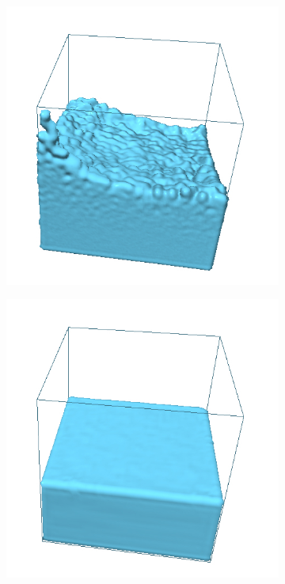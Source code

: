 \begin{figure}[h!]
\begin{subfigure}[t]{.3\textwidth}
		\label{fig:GaussSeidlRB}
	\end{subfigure}
		\begin{subfigure}[t]{.3\textwidth}
			\centering
        	\includegraphics[scale=0.8]{obrazky-figures/app/Simple03.jpg}
        	\label{fig:GaussSeidl}
	\end{subfigure}%
		\begin{subfigure}[t]{.3\textwidth}
			\centering
        	\includegraphics[scale=0.8]{obrazky-figures/app/Simple04.jpg}
        	\label{fig:GaussSeidl}
	\end{subfigure}%
	\label{fig:numGauss}
\end{figure}

